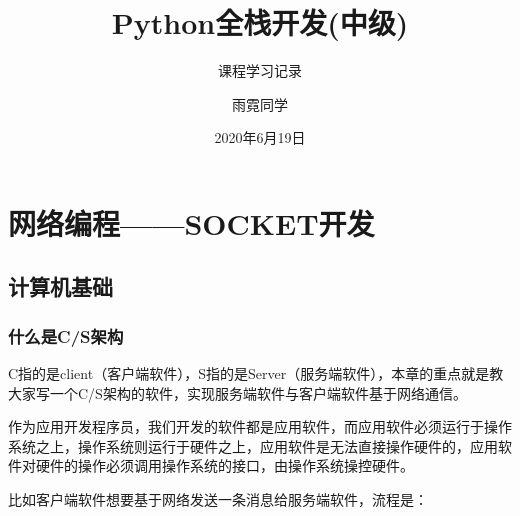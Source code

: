 \documentclass[cn,chinese,color=cyan]{elegantbook}
\title{Python全栈开发(中级)}
\subtitle{课程学习记录}
\author{雨霓同学}
\institute{鸢}
\date{2020年6月19日}
\begin{document}
\maketitle



\frontmatter







\newpage 
\tableofcontents

\mainmatter
\chapter{网络编程——SOCKET开发}
\section{计算机基础}
\subsection{什么是C/S架构}
C指的是client（客户端软件），S指的是Server（服务端软件），本章的重点就是教大家写一个C/S架构的软件，实现服务端软件与客户端软件基于网络通信。


作为应用开发程序员，我们开发的软件都是应用软件，而应用软件必须运行于操作系统之上，操作系统则运行于硬件之上，应用软件是无法直接操作硬件的，应用软件对硬件的操作必须调用操作系统的接口，由操作系统操控硬件。

比如客户端软件想要基于网络发送一条消息给服务端软件，流程是：
\end{document}
